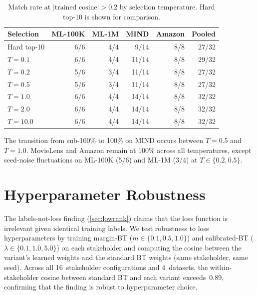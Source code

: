 \documentclass[11pt,letterpaper]{article}
\begin{document}
\begin{table}[h]
  \centering\small
  \caption{Match rate at $|\text{trained cosine}| > 0.2$ by selection
    temperature. Hard top-10 is shown for comparison.}
  \label{tab:temp_sweep}
  \begin{tabular}{lrrrrr}
    \toprule
    \textbf{Selection} & \textbf{ML-100K} & \textbf{ML-1M} &
      \textbf{MIND} & \textbf{Amazon} & \textbf{Pooled} \\
    \midrule
    Hard top-10 & 6/6 & 4/4 & 9/14  & 8/8 & 27/32 \\
    $T = 0.1$   & 6/6 & 4/4 & 11/14 & 8/8 & 29/32 \\
    $T = 0.2$   & 5/6 & 3/4 & 11/14 & 8/8 & 27/32 \\
    $T = 0.5$   & 5/6 & 3/4 & 11/14 & 8/8 & 27/32 \\
    $T = 1.0$   & 6/6 & 4/4 & 14/14 & 8/8 & 32/32 \\
    $T = 2.0$   & 6/6 & 4/4 & 14/14 & 8/8 & 32/32 \\
    $T = 10.0$  & 6/6 & 4/4 & 14/14 & 8/8 & 32/32 \\
    \bottomrule
  \end{tabular}
\end{table}

The transition from sub-100\% to 100\% on MIND occurs between
$T = 0.5$ and $T = 1.0$. MovieLens and Amazon remain at 100\% across
all temperatures, except seed-noise fluctuations on ML-100K (5/6) and
ML-1M (3/4) at $T \in \{0.2, 0.5\}$.

\section{Hyperparameter Robustness}
\label{app:hyperparameter}

The labels-not-loss finding (\cref{sec:lowrank}) claims that the loss
function is irrelevant given identical training labels. We test
robustness to loss hyperparameters by training margin-BT
($m \in \{0.1, 0.5, 1.0\}$) and calibrated-BT
($\lambda \in \{0.1, 1.0, 5.0\}$) on each stakeholder and computing
the cosine between the variant's learned weights and the standard BT
weights (same stakeholder, same seed). Across all 16~stakeholder
configurations and 4~datasets, the within-stakeholder cosine between
standard BT and each variant exceeds~0.89, confirming that the finding
is robust to hyperparameter choice.
\end{document}
